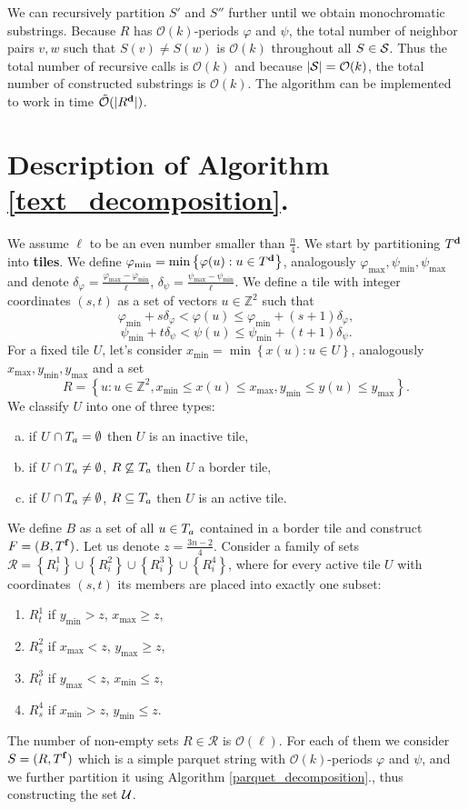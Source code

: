 \documentclass[11pt]{article}
\newcommand{\Z}{\mathbb{Z}}
\renewcommand{\O}{\mathcal{O}}
\newcommand{\tO}{\tilde{\mathcal{O}}}
\renewcommand{\phi}{\varphi}
\newcommand{\set}[1]{\left\lbrace #1 \right\rbrace}
\theoremstyle{plain}
\theoremstyle{definition}
\begin{document}
We can recursively partition $S'$ and $S''$ further until we obtain monochromatic substrings.
Because $R$ has $\O(k)$-periods $\phi$ and $\psi$, the total number of neighbor pairs $v, w$ such that $S(v) \neq S(w)$ is $\O(k)$ throughout all $S \in \S$.
Thus the total number of recursive calls is $\O(k)$ and because $|\S| = \O(k)$, the total number of constructed substrings is $\O(k)$.
The algorithm can be implemented to work in time $\tO(|\d{R}|)$.


\section{Description of Algorithm \ref{text_decomposition}.}

We assume $\ell$ to be an even number smaller than $\frac{n}{4}$. 
We start by partitioning $\d{T}$ into \textbf{tiles}.
We define $\phi_{\min} = \min \set{\phi(u) : u \in \d{T}}$, analogously $\phi_{\max}, \psi_{\min}, \psi_{\max}$ and denote $\delta_{\phi} = \frac{\phi_{\max} - \phi_{\min}}{\ell}$, $\delta_{\psi} = \frac{\psi_{\max} - \psi_{\min}}{\ell}$.
We define a tile with integer coordinates $(s, t)$ as a set of vectors $u \in \Z^2$ such that
$$ \phi_{\min} + s \delta_{\phi} < \phi(u) \le \phi_{\min} + (s + 1)\delta_{\phi}, $$ 
$$ \psi_{\min} + t \delta_{\psi} < \psi(u) \le \psi_{\min} + (t + 1)\delta_{\psi}. $$
For a fixed tile $U$, let's consider $x_{\min} = \min \set{x(u) : u \in U}$, analogously $x_{\max}, y_{\min}, y_{\max}$ and a set
$$ R = \set{u : u \in \Z^2, x_{\min} \le x(u) \le x_{\max}, y_{\min} \le y(u) \le y_{\max}}. $$
We classify $U$ into one of three types:
\begin{enumerate}[a)]
	\item if $U \cap \Ta = \emptyset$ then $U$ is an inactive tile,
	\item if $U \cap \Ta \neq \emptyset$, $R \not \subseteq \Ta$ then $U$ a border tile,
	\item if $U \cap \Ta \neq \emptyset$, $R \subseteq \Ta$ then $U$ is an active tile.
\end{enumerate}
We define $B$ as a set of all $u \in \Ta$ contained in a border tile and construct $F = (B, \f{T})$.
Let us denote $z = \frac{3n - 2}{4}$.
Consider a family of sets $\mathcal{R} = \set{R^1_i} \cup \set{R^2_i} \cup \set{R^3_i} \cup \set{R^4_i}$,
where for every active tile $U$ with coordinates $(s, t)$ its members are placed into exactly one subset:
\begin{enumerate}[1)]
	\item $R^1_{t}$ if $y_{\min} > z$, $x_{\max} \ge z$,
	\item $R^2_{s}$ if $x_{\max} < z$, $y_{\max} \ge z$,
	\item $R^3_{t}$ if $y_{\max} < z$, $x_{\min} \le z$,
	\item $R^4_{s}$ if $x_{\min} > z$, $y_{\min} \le z$.
\end{enumerate}
The number of non-empty sets $R \in \mathcal{R}$ is $\O(\ell)$.
For each of them we consider $S = (R, \f{T})$ which is a simple parquet string with $\O(k)$-periods $\phi$ and $\psi$,
and we further partition it using Algorithm \ref{parquet_decomposition}., thus constructing the set $\U$.
\end{document}
